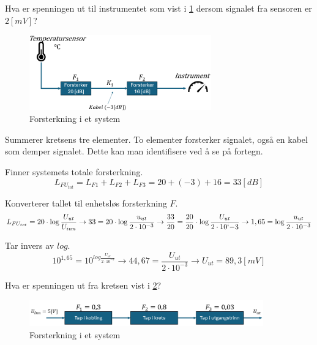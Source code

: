 \begin{question}[name=Oppgave, topic=forsterkning]
Hva er spenningen ut til instrumentet som vist i \ref{fig:forsterk3} dersom signalet fra sensoren er $2[mV]$?

	\begin{figure}[H]
	\centering
	\includegraphics[width=0.7\textwidth]{forsterkning/figurer/forsterkning2.png}
	\caption{Forsterkning i et system}
	\label{fig:forsterk3}
\end{figure}
\end{question}

\vspace{0.5cm} %

\begin{solution}[name=Løsningsforslag oppgave]
Summerer kretsens tre elementer. To elementer forsterker signalet, også en kabel som demper signalet. Dette kan man identifisere ved å se på fortegn.

Finner systemets totale forsterkning.
\[L_{FU_{tot}}=L_{F1}+L_{F2}+L_{F3}=20+(-3)+16= 33 [dB]\]

Konverterer tallet til enhetsløs forsterkning $F$.
\[L_{FU_{tot}} = 20 \cdot \log \frac{U_{ut}}{U_{inn}} \rightarrow 33=20 \cdot \log \frac{u_{ut}}{2 \cdot 10^{-3}} \rightarrow \frac{33}{20}=\frac{20}{20} \cdot \log \frac{U_{ut}}{2 \cdot 10`{-3}} \rightarrow 1,65 = \log \frac{u_{ut}}{2 \cdot 10^{-3}}\]

Tar invers av $log$.
\[10^{1,65} = 10^{log \frac{U_{ut}}{2 \cdot 10^{-3}}} \rightarrow 44,67 = \frac{U_{ut}}{2 \cdot 10^{-3}} \rightarrow U_{ut}=89,3[mV]\]
\end{solution}

\vspace{0.5cm} %

\begin{question}[name=Oppgave, topic=forsterkning]
Hva er spenningen ut fra kretsen vist i \ref{fig:forsterk4}?

	\begin{figure}[H]
		\centering
		\includegraphics[width=0.9\textwidth]{forsterkning/figurer/forsterkning3.png}
		\caption{Forsterkning i et system}
		\label{fig:forsterk4}
	\end{figure}
\end{question}

